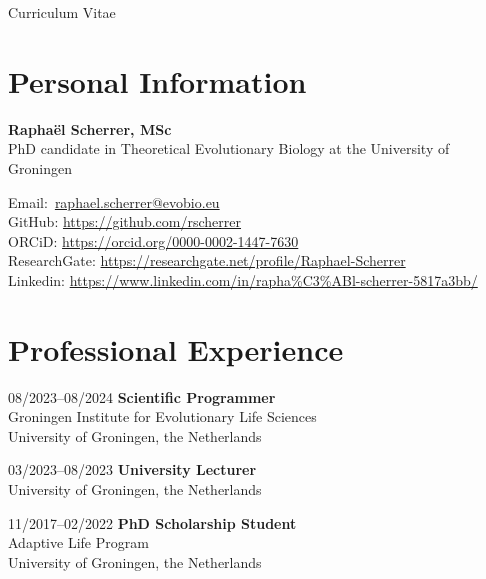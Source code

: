\documentclass[11pt,a4paper]{article}
\newcommand\email[1]{\href{mailto:#1}{{\emailfont #1}}}
\newcommand\emailfont{\sffamily}
\newcommand{\CVAuthor}{\textbf{Rapha\"{e}l Scherrer, MSc}}
\begin{document}
	\begin{cv}{Curriculum Vitae}
		
		\section{Personal Information}
		
		\begin{cvlist}{}
			
			\item \CVAuthor\\
			PhD candidate in Theoretical Evolutionary Biology at the University of Groningen
			
            \item Email:~\email{raphael.scherrer@evobio.eu}\\
			GitHub: \url{https://github.com/rscherrer}\\
			ORCiD: \url{https://orcid.org/0000-0002-1447-7630}\\
			ResearchGate: \url{https://researchgate.net/profile/Raphael-Scherrer}\\
			Linkedin: \url{https://www.linkedin.com/in/rapha%C3%ABl-scherrer-5817a3bb/}
			
		\end{cvlist}

        \section{Professional Experience}

        \begin{cvlist}{}

            \item[08/2023--08/2024]
            \textbf{Scientific Programmer}\\
            Groningen Institute for Evolutionary Life Sciences\\
            University of Groningen, the Netherlands

            \item[03/2023--08/2023]
            \textbf{University Lecturer}\\
            University of Groningen, the Netherlands
            
            \item[11/2017--02/2022]
            \textbf{PhD Scholarship Student}\\
            Adaptive Life Program\\
            University of Groningen, the Netherlands


\end{cvlist}
\end{cv}
\end{document}
